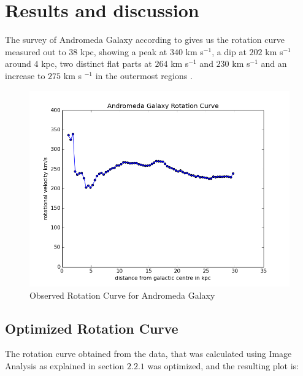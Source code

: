 	\chapter{Results and discussion}

The survey of Andromeda Galaxy according to \cite{observed} gives us the rotation curve measured out to $38$ kpc, showing a peak at $340$ km s$^{-1}$, a dip at $202$ km s$^{-1}$ around $4$ kpc, two distinct flat parts at $264$ km s$^{-1}$  and $230$ km s$^{-1}$ and an increase to $275$  km s $^{-1}$ in the outermost regions \cite{observed}.
\begin{figure} [h]
\centering
\includegraphics[scale=0.5]{rotcurve}
\caption{Observed Rotation Curve for Andromeda Galaxy}
\end{figure}

\section{Optimized Rotation Curve}

The rotation curve obtained from the data, that was calculated using Image Analysis as explained in section $ 2.2.1 $ was optimized, and the resulting plot is:

